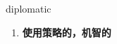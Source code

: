 
\begin{frame}
{\huge diplomatic}
\begin{center}
\begin{enumerate}\Large
  \item \textbf{使用策略的，机智的}
\end{enumerate}
\end{center}
\end{frame}
